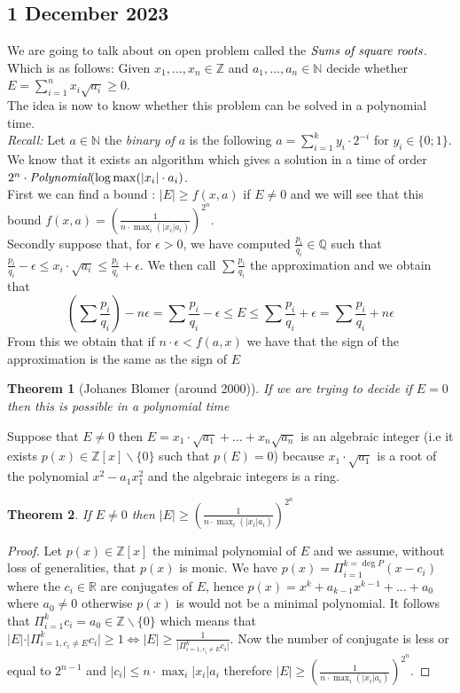 \documentclass[a4paper,11pt,american]{article}
\newcommand{\N}{\mathbb{N}}
\newcommand{\Q}{\mathbb{Q}}
\newcommand{\R}{\mathbb{R}}
\newcommand{\Z}{\mathbb{Z}}
\theoremstyle{plain}
\newtheorem{theorem}{Theorem}
\theoremstyle{definition}
\begin{document}
\subsection*{1 December 2023}
We are going to talk about on open problem called the $\emph{Sums of square roots}$.\\
Which is  as follows:  Given
 $x_1,\dots,x_n \in \Z$ and  $a_1,\dots,a_n \in \N$
 decide whether $ E= \sum_{i=1}^n x_i \sqrt{a_i} \geq0$.\\
 The idea is now to know whether this problem can be solved in a polynomial time.\\
 \emph{Recall:} Let $a\in\N$ the \emph{binary of $a$} is the following $a=\sum_{i=1}^ky_i\cdot2^{-i}$ for $y_i\in\{0;1\}$.\\
 We know that it exists an algorithm which gives a solution in a time of order $2^n\cdot\emph{Polynomial}(\log\max(\vert x_i\vert\cdot a_i)$.\\
 First we can find a bound : $\vert E\vert \geq f(x,a)$ if $E\neq 0$ and we will see that this bound $f(x,a)=(\frac{1}{n\cdot\max_i(\vert x_i\vert a_i)})^{2^n}$.\\
 Secondly suppose that, for $\epsilon>0$, we have computed $\frac{p_i}{q_i}\in\Q$ such that $\frac{p_i}{q_i}-\epsilon\leq x_i\cdot\sqrt{a_i}\leq \frac{p_i}{q_i}+ \epsilon$. We then call $\sum \frac{p_i}{q_i}$ the approximation and we obtain that $$(\sum\frac{p_i}{q_i})-n\epsilon=\sum\frac{p_i}{q_i}-\epsilon\leq E\leq \sum\frac{p_i}{q_i}+\epsilon=\sum\frac{p_i}{q_i}+n\epsilon$$
 From this we obtain that if $n\cdot\epsilon<f(a,x)$ we have that the sign of the approximation is the same as the sign of $E$\\
 \begin{theorem}[Johanes Blomer (around 2000)]
     If we are trying to decide if $E=0$ then this is possible in a polynomial time
 \end{theorem}
     Suppose that $E\neq 0$ then $E=x_1\cdot \sqrt{a_1}+\dots+ x_n\sqrt{a_n}$ is an algebraic integer (i.e it exists $p(x)\in\Z[x]\backslash\{0\}$ such that $p(E)=0$) because $x_1\cdot \sqrt{a_1}$ is a root of the polynomial $x^2-a_1x_1^2$ and the algebraic integers is a ring.
 \begin{theorem}
     If $E\neq 0$ then $\vert E\vert \geq(\frac{1}{n\cdot\max_i(\vert x_i\vert a_i)})^{2^n}$ 
 \end{theorem}
 \begin{proof}
     Let $p(x)\in\Z[x]$ the minimal polynomial of $E$ and we assume, without loss of generalities, that $p(x)$ is monic. We have $p(x)=\Pi^{k=\deg P}_{i=1}(x-c_i)$ where the $c_i\in \R$ are conjugates of $E$, hence $p(x)=x^k+a_{k-1}x^{k-1}+\dots +a_0$ where $a_0\neq 0$ otherwise $p(x)$ is would not be a minimal polynomial. It follows that $\Pi^k_{i=1}c_i=a_0\in\Z\backslash\{0\}$ which means that $\vert E\vert\cdot \vert\Pi_{i=1,c_i\neq E}^kc_i\vert\geq 1\iff \vert E\vert\geq\frac{1}{\vert\Pi_{i=1,c_i\neq E}^kc_i\vert}$. Now the number of conjugate is less or equal to $2^{n-1}$ and $\vert c_i\vert\leq n\cdot \max_i\vert x_i\vert a_i$ therefore $\vert E\vert\geq (\frac{1}{n\cdot\max_i(\vert x_i\vert a_i)})^{2^n}$. 
 \end{proof}
\end{document}
